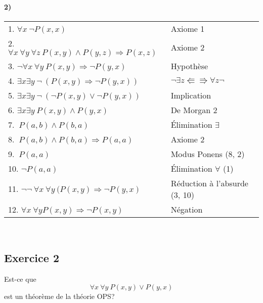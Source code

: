     \paragraph{2)}
    \begin{center}
    \begin{tabular}{|l|l|}
    \hline
    1. $\forall x \ \neg P(x, x)$ & Axiome 1 \\
    2. $\forall x \ \forall y \ \forall z \ P(x, y) \wedge P(y, z) \Rightarrow P(x, z)$ & Axiome 2 \\
    \hspace{0.5cm} 3. $\neg \forall x \ \forall y \  P(x, y) \Rightarrow \neg P(y,x)$ & Hypothèse \\
    \hspace{0.5cm} 4. $ \exists x \exists y \ \neg \ \left( P(x, y) \Rightarrow \neg P(y,x) \right) $ & $\neg \exists z \Lleftarrow \Rrightarrow \forall z \neg$ \\
    \hspace{0.5cm} 5. $ \exists x \exists y \ \neg \ \left(\neg P(x, y) \lor \neg P(y,x) \right) $ & Implication \\
    \hspace{0.5cm} 6. $ \exists x \exists y \ P(x, y) \land P(y,x) $ & De Morgan 2 \\
    \hspace{0.5cm} 7. $ \ P(a, b) \land P(b,a) $ & Élimination $\exists$ \\
    \hspace{0.5cm} 8. $ \ P(a, b) \land P(b,a) \Rightarrow P(a,a) $ & Axiome 2 \\
    \hspace{0.5cm} 9. $ \ P(a,a) $ & Modus Ponens (8, 2) \\
    \hspace{0.5cm} 10. $ \neg P(a, a) $ & Élimination $\forall$ (1) \\
    11. $ \neg\neg \ \forall x \ \forall y \ (P(x, y) \Rightarrow \neg P(y,x) $ & Réduction à l'absurde (3, 10) \\
    12. $ \forall x \ \forall y P(x,y) \Rightarrow \neg P(x,y) $ & Négation \\


\hline
\end{tabular}\\
\end{center}
\subsection*{Exercice 2}
Est-ce que
$$
\forall x \ \forall y \ P(x, y) \vee P(y, x)
$$
est un th\'{e}or\`{e}me de la th\'{e}orie OPS?

